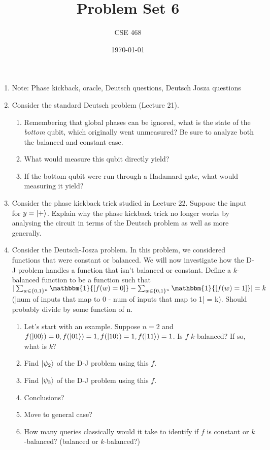 \documentclass[12pt]{article}
\title{Problem Set 6}
\author{CSE 468}
\date{\today}
\begin{document}
\maketitle



\begin{enumerate}[font=\bfseries]

    \item Note: Phase kickback, oracle, Deutsch questions, Deutsch Josza questions
    \item Consider the standard Deutsch problem (Lecture 21).
    \begin{enumerate}
        \item Remembering that global phases can be ignored, what is the state of the \emph{bottom} qubit, which originally went unmeasured? Be sure to analyze both the balanced and constant case.
        \item What would measure this qubit directly yield?
        \item If the bottom qubit were run through a Hadamard gate, what would measuring it yield?
    \end{enumerate}
    \item Consider the phase kickback trick studied in Lecture 22. Suppose the input for $y = \ket{+}$. Explain why the phase kickback trick no longer works by analysing the circuit in terms of the Deutsch problem as well as more generally.
    \item Consider the Deutsch-Josza problem. In this problem, we considered functions that were constant or balanced. We will now investigate how the D-J problem handles a function that isn't balanced or constant. Define a $k$-balanced function to be a function such that $|\sum_{w\in\{0,1\}^n} \mathbbm{1}{[f(w) = 0]} - \sum_{w\in\{0,1\}^n} \mathbbm{1}{[f(w) = 1]}| = k$ (|num of inputs that map to 0 - num of inputs that map to 1| = k). Should probably divide by some function of n.
    \begin{enumerate}
        \item Let's start with an example. Suppose $n = 2$ and $f(\ket{00}) = 0, f(\ket{01}) = 1, f(\ket{10}) = 1, f(\ket{11}) = 1$. Is $f$ $k$-balanced? If so, what is $k$?
        \item Find $\ket{\psi_2}$ of the D-J problem using this $f$.
        \item Find $\ket{\psi_3}$ of the D-J problem using this $f$.
        \item Conclusions?
        \item Move to general case?
        \item How many queries classically would it take to identify if $f$ is constant or $k$-balanced? (balanced or $k$-balanced?)
    \end{enumerate}
    
\end{enumerate}
\end{document}
